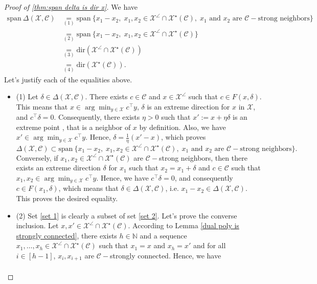 \documentclass[11pt]{article}
\theoremstyle{plain}
\theoremstyle{definition}
\newcommand{\Vect}{\mathrm{span}~}
\newcommand{\dualpoly}[2]{#1^\star\left(#2\right)}
\newcommand{\cX}{\mathcal{X}}
\newcommand{\cC}{\mathcal{C}}
\newcommand{\dir}[1]{\mathrm{dir}\left(#1\right)}
\begin{document}
\begin{proof}[Proof of \cref{thm:span delta is dir x}]

We have
    \begin{align} 
        \Vect \Delta(\cX,\cC)& \underset{(1)}{=} \Vect \{x_1-x_2,\; x_1,x_2\in \cX^\angle\cap \dualpoly{\cX}{\cC},\; x_1 \text{ and }x_2 \text{ are $\cC-$strong neighbors}\} \label{set 1}
        \\& \underset{(2)}{=} \Vect \{x_1-x_2,\; x_1,x_2\in \cX^\angle\cap \dualpoly{\cX}{\cC}\} \label{set 2}
        \\& \underset{(3)}{=}\dir{\cX^\angle\cap \dualpoly{\cX}{\cC}} \label{set 3}
        \\&\underset{(4)}{=}\dir{\dualpoly{\cX}{\cC}}.\label{set 5}
    \end{align}
    Let's justify each of the equalities above.
    \begin{itemize}
        \item (1) Let $\delta \in \Delta(\cX,\cC)$. There exists $c\in \cC$ and $x\in \cX^\angle$ such that $c\in F(x,\delta)$. This means that $x\in \arg\min_{y\in \cX}c^\top y$, $\delta$ is an extreme direction for $x$ in $\cX$, and $c^\top \delta=0$. Consequently, there exists $\eta>0$ such that $x':=x+\eta \delta $ is an extreme point%
        , that is a neighbor of $x$ by definition. Also, we have $x'\in \arg\min_{y\in \cX}c^\top y$. Hence, $\delta =\frac{1}{\eta}(x'-x)$, which proves
        $$\Delta(\cX,\cC)\subset \Vect\{x_1-x_2,\; x_1,x_2\in \cX^\angle\cap \dualpoly{\cX}{\cC},\; x_1 \text{ and }x_2 \text{ are $\cC-$strong neighbors}\}.$$
        Conversely, if $x_1,x_2\in \cX^\angle \cap \dualpoly{\cX}{\cC}$ are $\cC-$strong neighbors, then there exists an extreme direction $\delta$ for $x_1$ such that $x_2=x_1 + \delta$ and $c\in \cC$ such that $x_1,x_2\in \arg\min_{y\in \cX}c^\top y$. Hence, we have $c^\top \delta=0$, and consequently $c\in F(x_1,\delta)$, which means that $\delta \in \Delta(\cX,\cC)$, i.e. $x_1-x_2 \in \Delta (\cX,\cC)$. This proves the desired equality.
        \item (2) Set \cref{set 1} is clearly a subset of set \cref{set 2}. Let's prove the converse inclusion. Let $x,x'\in \cX^\angle \cap \dualpoly{\cX}{\cC}$. According to Lemma \ref{dual poly is strongly connected}, there exists $h\in \mathbb N$ and a sequence $x_1,\dots,x_h\in \cX^\angle \cap \dualpoly{\cX}{\cC}$ such that $x_1=x$ and $x_h=x'$ and for all $i\in [h-1]$, $x_i,x_{i+1}$ are $\cC-$strongly connected. Hence, we have 
        \begin{align*}

\end{align*}
\end{itemize}
\end{proof}
\end{document}
